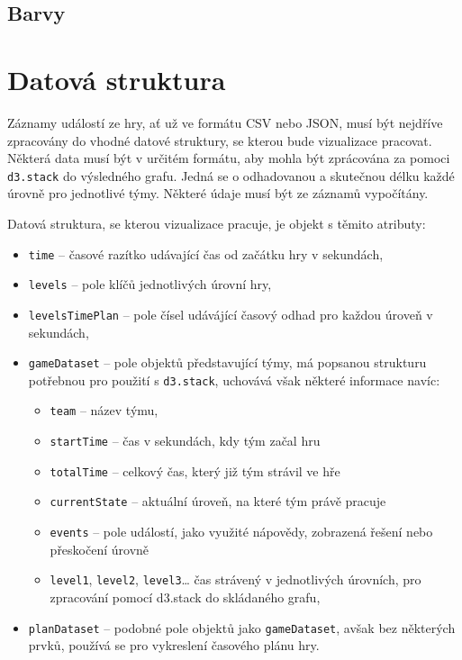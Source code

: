 \documentclass[
  digital, %
  oneside, %
  table,   %
  nolof,     %
  nolot,     %
]{fithesis3}
\begin{document}
\subsection{Barvy}

\section{Datová struktura}
Záznamy událostí ze hry, ať už ve formátu CSV nebo JSON, musí být nejdříve zpracovány do vhodné datové struktury, se kterou bude vizualizace pracovat. Některá data musí být v určitém formátu, aby mohla být zprácována za pomoci \verb|d3.stack| do výsledného grafu. Jedná se o odhadovanou a skutečnou délku každé úrovně pro jednotlivé týmy. Některé údaje musí být ze záznamů vypočítány.\par Datová struktura, se kterou vizualizace pracuje, je objekt s těmito atributy:
\begin{itemize}
  \item \verb|time| – časové razítko udávající čas od začátku hry v sekundách,
  \item \verb|levels| – pole klíčů jednotlivých úrovní hry,
  \item \verb|levelsTimePlan| – pole čísel udávájící časový odhad pro každou úroveň v sekundách,
  \item \verb|gameDataset| – pole objektů představující týmy, má popsanou strukturu potřebnou pro použití s \verb|d3.stack|, uchovává však některé informace navíc:
  	\begin{itemize}
		\item \verb|team| – název týmu,
		\item \verb|startTime| – čas v sekundách, kdy tým začal hru
		\item \verb|totalTime| – celkový čas, který již tým strávil ve hře
		\item \verb|currentState| – aktuální úroveň, na které tým právě pracuje
		\item \verb|events| – pole událostí, jako využité nápovědy, zobrazená řešení nebo přeskočení úrovně
		\item \verb|level1|, \verb|level2|, \verb|level3|… čas strávený v jednotlivých úrovních, pro zpracování pomocí d3.stack do skládaného grafu,
	\end{itemize}
  \item \verb|planDataset| – podobné pole objektů jako \verb|gameDataset|, avšak bez některých prvků, používá se pro vykreslení časového plánu hry.
\end{itemize}
\end{document}
